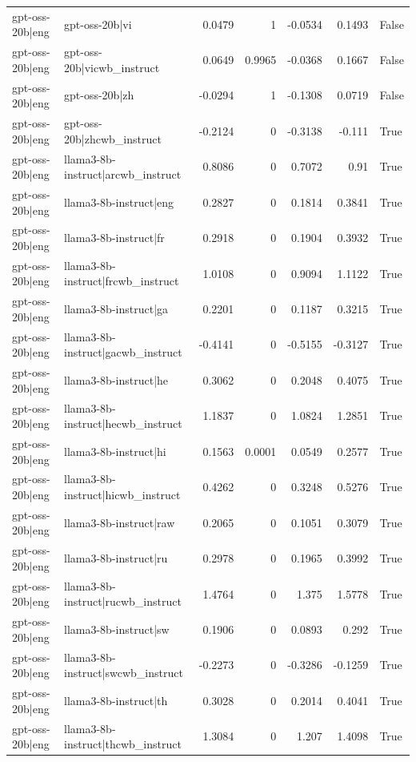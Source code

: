 \begin{table}
\begin{tabular}{l l r r r r l}
gpt-oss-20b|eng & gpt-oss-20b|vi & 0.0479 & 1 & -0.0534 & 0.1493 & False \\
gpt-oss-20b|eng & gpt-oss-20b|vicwb_instruct & 0.0649 & 0.9965 & -0.0368 & 0.1667 & False \\
gpt-oss-20b|eng & gpt-oss-20b|zh & -0.0294 & 1 & -0.1308 & 0.0719 & False \\
gpt-oss-20b|eng & gpt-oss-20b|zhcwb_instruct & -0.2124 & 0 & -0.3138 & -0.111 & True \\
gpt-oss-20b|eng & llama3-8b-instruct|arcwb_instruct & 0.8086 & 0 & 0.7072 & 0.91 & True \\
gpt-oss-20b|eng & llama3-8b-instruct|eng & 0.2827 & 0 & 0.1814 & 0.3841 & True \\
gpt-oss-20b|eng & llama3-8b-instruct|fr & 0.2918 & 0 & 0.1904 & 0.3932 & True \\
gpt-oss-20b|eng & llama3-8b-instruct|frcwb_instruct & 1.0108 & 0 & 0.9094 & 1.1122 & True \\
gpt-oss-20b|eng & llama3-8b-instruct|ga & 0.2201 & 0 & 0.1187 & 0.3215 & True \\
gpt-oss-20b|eng & llama3-8b-instruct|gacwb_instruct & -0.4141 & 0 & -0.5155 & -0.3127 & True \\
gpt-oss-20b|eng & llama3-8b-instruct|he & 0.3062 & 0 & 0.2048 & 0.4075 & True \\
gpt-oss-20b|eng & llama3-8b-instruct|hecwb_instruct & 1.1837 & 0 & 1.0824 & 1.2851 & True \\
gpt-oss-20b|eng & llama3-8b-instruct|hi & 0.1563 & 0.0001 & 0.0549 & 0.2577 & True \\
gpt-oss-20b|eng & llama3-8b-instruct|hicwb_instruct & 0.4262 & 0 & 0.3248 & 0.5276 & True \\
gpt-oss-20b|eng & llama3-8b-instruct|raw & 0.2065 & 0 & 0.1051 & 0.3079 & True \\
gpt-oss-20b|eng & llama3-8b-instruct|ru & 0.2978 & 0 & 0.1965 & 0.3992 & True \\
gpt-oss-20b|eng & llama3-8b-instruct|rucwb_instruct & 1.4764 & 0 & 1.375 & 1.5778 & True \\
gpt-oss-20b|eng & llama3-8b-instruct|sw & 0.1906 & 0 & 0.0893 & 0.292 & True \\
gpt-oss-20b|eng & llama3-8b-instruct|swcwb_instruct & -0.2273 & 0 & -0.3286 & -0.1259 & True \\
gpt-oss-20b|eng & llama3-8b-instruct|th & 0.3028 & 0 & 0.2014 & 0.4041 & True \\
gpt-oss-20b|eng & llama3-8b-instruct|thcwb_instruct & 1.3084 & 0 & 1.207 & 1.4098 & True \\

\end{tabular}
\end{table}
